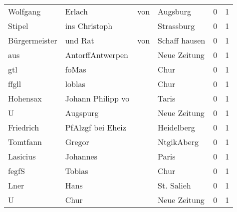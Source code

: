 \begin{center}
\begin{tiny}
\begin{longtabu}{llllrr}
                 Wolfgang &                             Erlach &         von &                                    Augsburg &          0 &         1 \\
                   Stipel &                      ins Christoph &             &                                  Strassburg &          0 &         1 \\
            Bürgermeister &                            und Rat &         von &                               Schaff hausen &          0 &         1 \\
                      aus &                   AntorffAntwerpen &             &                                Neue Zeitung &          0 &         1 \\
                      gtl &                              foMas &             &                                        Chur &          0 &         1 \\
                    ffgll &                             loblas &             &                                        Chur &          0 &         1 \\
                 Hohensax &                  Johann Philipp vo &             &                                       Taris &          0 &         1 \\
                        U &                           Augspurg &             &                                Neue Zeitung &          0 &         1 \\
                Friedrich &                  PfAlzgf bei Eheiz &             &                                  Heidelberg &          0 &         1 \\
                 Tomtfann &                             Gregor &             &                                  NtgikAberg &          0 &         1 \\
                 Lasicius &                           Johannes &             &                                       Paris &          0 &         1 \\
                    fegfS &                             Tobias &             &                                        Chur &          0 &         1 \\
                     Lner &                               Hans &             &                                  St. Salieh &          0 &         1 \\
                        U &                               Chur &             &                                Neue Zeitung &          0 &         1 \\

\end{longtabu}
\end{tiny}
\end{center}
